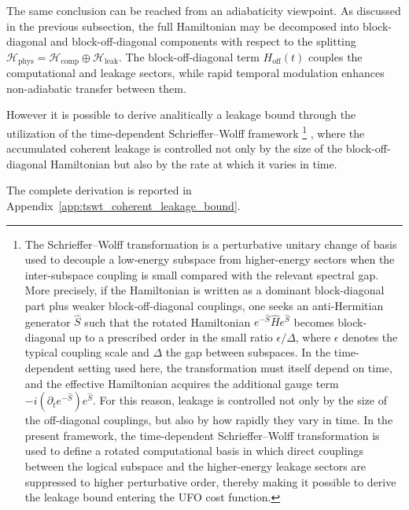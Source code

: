 The same conclusion can be reached from an adiabaticity viewpoint. As discussed in the previous subsection, the full Hamiltonian may be decomposed into block-diagonal and block-off-diagonal components with respect to the splitting
\(
\mathcal{H}_{\mathrm{phys}}
=
\mathcal{H}_{\mathrm{comp}}
\oplus
\mathcal{H}_{\mathrm{leak}}.
\)
The block-off-diagonal term $H_{\mathrm{off}}(t)$ couples the computational and leakage sectors, while rapid temporal modulation enhances non-adiabatic transfer between them.


However it is possible to derive analitically a leakage bound through the utilization of the time-dependent Schrieffer--Wolff framework
\footnote{
    The Schrieffer--Wolff transformation is a perturbative unitary change of basis used to decouple a low-energy subspace from higher-energy sectors when the inter-subspace coupling is small compared with the relevant spectral gap. More precisely, if the Hamiltonian is written as a dominant block-diagonal part plus weaker block-off-diagonal couplings, one seeks an anti-Hermitian generator \(\hat S\) such that the rotated Hamiltonian \(e^{-\hat S}\hat H e^{\hat S}\) becomes block-diagonal up to a prescribed order in the small ratio \(\epsilon/\Delta\), where \(\epsilon\) denotes the typical coupling scale and \(\Delta\) the gap between subspaces. In the time-dependent setting used here, the transformation must itself depend on time, and the effective Hamiltonian acquires the additional gauge term \(-i(\partial_t e^{-\hat S})e^{\hat S}\). For this reason, leakage is controlled not only by the size of the off-diagonal couplings, but also by how rapidly they vary in time. In the present framework, the time-dependent Schrieffer--Wolff transformation is used to define a rotated computational basis in which direct couplings between the logical subspace and the higher-energy leakage sectors are suppressed to higher perturbative order, thereby making it possible to derive the leakage bound entering the UFO cost function.
    }
    , where the accumulated coherent leakage is controlled not only by the size of the block-off-diagonal Hamiltonian but also by the rate at which it varies in time. 
    

The complete derivation is reported in Appendix~\ref{app:tswt_coherent_leakage_bound}.

